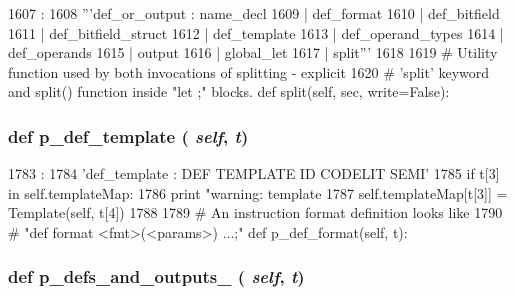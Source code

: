 \begin{DoxyCode}
1607                                 :
1608         '''def_or_output : name_decl
1609                          | def_format
1610                          | def_bitfield
1611                          | def_bitfield_struct
1612                          | def_template
1613                          | def_operand_types
1614                          | def_operands
1615                          | output
1616                          | global_let
1617                          | split'''
1618 
1619     # Utility function used by both invocations of splitting - explicit
1620     # 'split' keyword and split() function inside "let {{ }};" blocks.
    def split(self, sec, write=False):
\end{DoxyCode}
\hypertarget{classisa__parser_1_1ISAParser_acfab746fcb8e4b603b036cec011f6f5c}{
\subsubsection[{p\_\-def\_\-template}]{\setlength{\rightskip}{0pt plus 5cm}def p\_\-def\_\-template ( {\em self}, \/   {\em t})}}
\label{classisa__parser_1_1ISAParser_acfab746fcb8e4b603b036cec011f6f5c}



\begin{DoxyCode}
1783                                :
1784         'def_template : DEF TEMPLATE ID CODELIT SEMI'
1785         if t[3] in self.templateMap:
1786             print "warning: template %
1787         self.templateMap[t[3]] = Template(self, t[4])
1788 
1789     # An instruction format definition looks like
1790     # "def format <fmt>(<params>) {{...}};"
    def p_def_format(self, t):
\end{DoxyCode}
\hypertarget{classisa__parser_1_1ISAParser_a71c1d6db62003c725d53d9b25ccea6f0}{
\subsubsection[{p\_\-defs\_\-and\_\-outputs\_\-0}]{\setlength{\rightskip}{0pt plus 5cm}def p\_\-defs\_\-and\_\-outputs\_ ( {\em self}, \/   {\em t})}}
\label{classisa__parser_1_1ISAParser_a71c1d6db62003c725d53d9b25ccea6f0}




